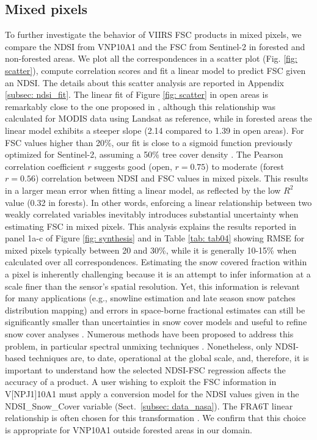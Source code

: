 \documentclass[tc, manuscript]{copernicus}
\begin{document}
\subsection{Mixed pixels}

To further investigate the behavior of VIIRS FSC products in mixed pixels, we compare the NDSI from VNP10A1 and the FSC from Sentinel-2 in forested and non-forested areas. We plot all the correspondences in a scatter plot (Fig. \ref{fig: scatter}), compute correlation scores and fit a linear model to predict FSC given an NDSI. The details about this scatter analysis are reported in Appendix \ref{subsec: ndsi_fit}. The linear fit of Figure \ref{fig: scatter} in open areas is remarkably close to the one proposed in \citep{salomonson_development_2006}, although this relationship was calculated for MODIS data using Landsat as reference, while in forested areas the linear model exhibits a steeper slope (2.14 compared to 1.39 in open areas). For FSC values higher than 20\%, our fit is close to a sigmoid function previously optimized for Sentinel-2, assuming a 50\% tree cover density \citep{gascoin_estimating_2020}. 
The Pearson correlation coefficient $r$ suggests good (open, $r=0.75$) to moderate (forest $r=0.56$) correlation between NDSI and FSC values in mixed pixels. This results in a larger mean error when fitting a linear model, as reflected by the low $R^2$ value (0.32 in forests). In other words, enforcing a linear relationship between two weakly correlated variables inevitably introduces substantial uncertainty when estimating FSC in mixed pixels. This analysis explains the results reported in panel 1a-c of Figure \ref{fig: synthesis} and in Table \ref{tab: tab04} showing RMSE for mixed pixels typically between 20 and 30\%, while it is generally 10-15\% when calculated over all correspondences. Estimating the snow covered fraction within a pixel is inherently challenging because it is an attempt to infer information at a scale finer than the sensor’s spatial resolution. Yet, this information is relevant for many applications (e.g., snowline estimation and late season snow patches distribution mapping) and errors in space-borne fractional estimates can still be significantly smaller than uncertainties in snow cover models \citep{girotto_data_2020} and useful to refine snow cover analyses  \citep{aalstad_evaluating_2020}. Numerous methods have been proposed to address this problem, in particular spectral unmixing techniques \citep{painter_retrieval_2009}. Nonetheless, only NDSI-based techniques are, to date, operational at the global scale, and, therefore, it is important to understand how the selected NDSI-FSC regression affects the accuracy of a product. A user wishing to exploit the FSC information in V[NP\textbar J1]10A1 must apply a conversion model for the NDSI values given in the NDSI\_Snow\_Cover variable (Sect.~\ref{subsec: data_nasa}). The FRA6T linear relationship \citep{salomonson_development_2006} is often chosen for this transformation \citep{stillinger_landsat_2023,masson_assessment_2018}. We confirm that this choice is appropriate for VNP10A1 outside forested areas in our domain. 
\end{document}
